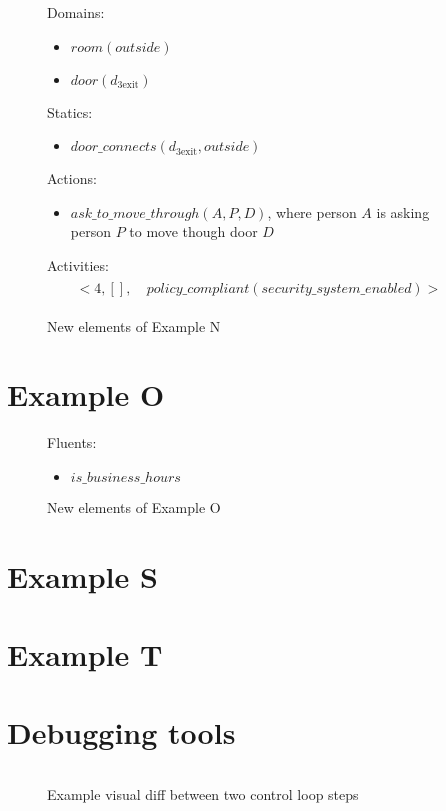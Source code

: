 \begin{figure}[H]
    \begin{framed}
        Domains:
        \begin{itemize}
            \item $room(outside)$
            \item $door(d_{3\text{exit}})$
        \end{itemize}

        Statics:
        \begin{itemize}
            \item $door\_connects(d_{3\text{exit}}, outside)$
        \end{itemize}

        Actions:
        \begin{itemize}
            \item $ask\_to\_move\_through(A, P, D)$, where person $A$ is asking person $P$ to move though door $D$
        \end{itemize}

        Activities:
        \begin{gather}
        \begin{split}
            <4, [
            ], & \ policy\_compliant(security\_system\_enabled)>
        \end{split}
        \end{gather}
    \end{framed}
    \caption{New elements of Example N}
    \label{fig:apia_example_n_description}
\end{figure}

\section{Example O}

\begin{figure}[H]
    \begin{framed}
        Fluents:
        \begin{itemize}
            \item $is\_business\_hours$
        \end{itemize}
    \end{framed}
    \caption{New elements of Example O}
    \label{fig:apia_example_o_description}
\end{figure}

\section{Example S}

\section{Example T}

\section{Debugging tools}

\begin{figure}[H]
    \inputminted[fontsize=\tiny]{diff}{Figures/APIA_Architecture/Examples/Authorization/Example_A/diff_test.snippet.txt}
    \caption{Example visual diff between two control loop steps}
    \label{fig:apia_diff_test}
\end{figure}

